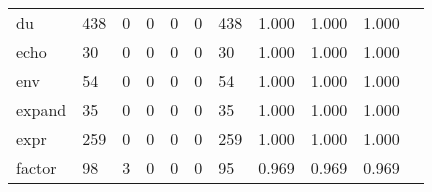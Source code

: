 \begin{longtable}{lp{1.2cm}p{1.2cm}p{1.2cm}p{1.2cm}p{1.2cm}p{1.2cm}p{1.2cm}p{1.2cm}p{1.2cm}p{1.2cm}}
du        &                                   438 &                                                  0 &                                                  0 &                                                  0 &                                                  0 &                                                438 &                                              1.000 &                                              1.000 &                                              1.000 \\
echo      &                                    30 &                                                  0 &                                                  0 &                                                  0 &                                                  0 &                                                 30 &                                              1.000 &                                              1.000 &                                              1.000 \\
env       &                                    54 &                                                  0 &                                                  0 &                                                  0 &                                                  0 &                                                 54 &                                              1.000 &                                              1.000 &                                              1.000 \\
expand    &                                    35 &                                                  0 &                                                  0 &                                                  0 &                                                  0 &                                                 35 &                                              1.000 &                                              1.000 &                                              1.000 \\
expr      &                                   259 &                                                  0 &                                                  0 &                                                  0 &                                                  0 &                                                259 &                                              1.000 &                                              1.000 &                                              1.000 \\
factor    &                                    98 &                                                  3 &                                                  0 &                                                  0 &                                                  0 &                                                 95 &                                              0.969 &                                              0.969 &                                              0.969 \\

\end{longtable}
